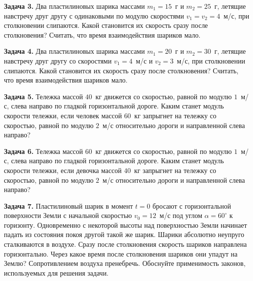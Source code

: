 \begin{taskbasic}[code={\label{task:momentum_v3_n22}}]
\textbf{Задача 3.} Два пластилиновых шарика массами $m_1 = 15$~г и $m_2 = 25$~г, летящие навстречу друг другу с одинаковыми по модулю скоростями $v_1 = v_2 = 4$~м/с, при столкновении слипаются. Какой становится их скорость сразу после столкновения? Считать, что время взаимодействия шариков мало.

\end{taskbasic}

\begin{taskbasic}[code={\label{task:momentum_v4_n22}}]
\textbf{Задача 4.} Два пластилиновых шарика массами $m_1 = 20$~г и $m_2 = 30$~г, летящие навстречу друг другу со скоростями $v_1 = 4$~м/с и $v_2 = 3$~м/с, при столкновении слипаются. Какой становится их скорость сразу после столкновения? Считать, что время взаимодействия шариков мало.

\end{taskbasic}

\begin{taskbasic}[code={\label{task:momentum_v5_n22}}]
\textbf{Задача 5.} Тележка массой $40$~кг движется со скоростью, равной по модулю $1$~м/с, слева направо по гладкой горизонтальной дороге. Каким станет модуль скорости тележки, если человек массой $60$~кг запрыгнет на тележку со скоростью, равной по модулю $2$~м/с относительно дороги и направленной слева направо?

\end{taskbasic}

\begin{taskbasic}[code={\label{task:momentum_v6_n22}}]
\textbf{Задача 6.} Тележка массой $60$~кг движется со скоростью, равной по модулю $1$~м/с, слева направо по гладкой горизонтальной дороге. Каким станет модуль скорости тележки, если девочка массой $40$~кг запрыгнет на тележку со скоростью, равной по модулю $2$~м/с относительно дороги и направленной слева направо?

\end{taskbasic}

\begin{taskbasic}[code={\label{task:momentum_v15_n26}}]
\textbf{Задача 7.} Пластилиновый шарик в момент $t = 0$ бросают с горизонтальной поверхности Земли с начальной скоростью $v_0 = 12$~м/с под углом $\alpha = 60^{\circ}$ к горизонту. Одновременно с некоторой высоты над поверхностью Земли начинает падать из состояния покоя другой такой же шарик. Шарики абсолютно неупруго сталкиваются в воздухе. Сразу после столкновения скорость шариков направлена горизонтально. Через какое время после столкновения шариков они упадут на Землю? Сопротивлением воздуха пренебречь. Обоснуйте применимость законов, используемых для решения задачи.

\end{taskbasic}

